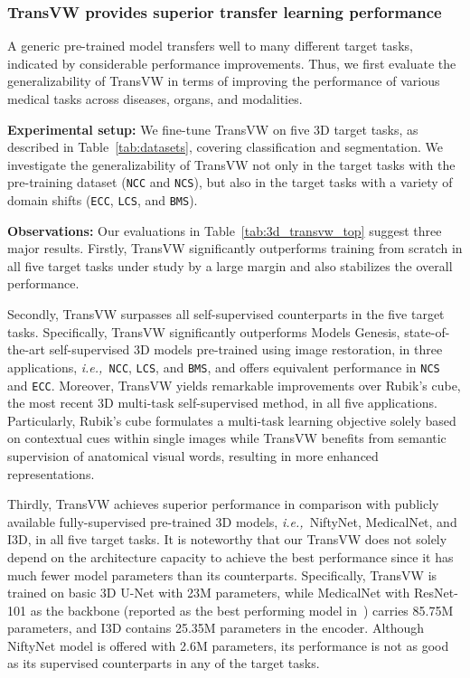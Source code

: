 \documentclass[journal,twoside,web]{ieeecolor}
\def\tablename{Table}
\newcommand{\ie}{\mbox{\emph{i.e.,\ }}}
\begin{document}
\subsubsection {TransVW provides superior transfer learning performance}
\label{sec:result_annot_effic_performance}
A generic pre-trained model transfers well to many different target tasks, indicated by considerable performance improvements. Thus, we first evaluate the generalizability of TransVW in terms of improving the performance of various medical tasks across diseases, organs, and modalities. 

\smallskip
\noindent\textbf{Experimental setup:} We fine-tune TransVW on five 3D target tasks, as described in \tablename~\ref{tab:datasets}, covering classification and segmentation. We investigate the generalizability of TransVW  not only in the target tasks with the pre-training dataset   (\texttt{NCC} and \texttt{NCS}), but also in the target tasks with a variety of domain shifts (\texttt{ECC}, \texttt{LCS}, and \texttt{BMS}).




\smallskip
\noindent\textbf{Observations:} Our evaluations in \tablename~\ref{tab:3d_transvw_top} suggest three major results. 
Firstly, TransVW significantly outperforms training from scratch in all five target tasks under study by  a large margin and also stabilizes the overall performance.

Secondly, TransVW surpasses all self-supervised counterparts in the five target tasks. Specifically, TransVW significantly outperforms Models Genesis, state-of-the-art self-supervised 3D models pre-trained using image restoration, in three applications, \ie \texttt{NCC}, \texttt{LCS}, and \texttt{BMS}, and offers equivalent performance in \texttt{NCS} and \texttt{ECC}.  Moreover, TransVW yields remarkable improvements over Rubik's cube, the most recent 3D multi-task self-supervised method, in all five applications. Particularly,  Rubik's cube formulates a multi-task learning objective solely based on contextual cues within single images while TransVW benefits from semantic supervision of anatomical visual words, resulting in more enhanced representations.

 Thirdly, TransVW achieves superior performance in comparison with publicly available fully-supervised  pre-trained 3D models, \ie NiftyNet, MedicalNet, and I3D, in all five target tasks.  It is noteworthy that our TransVW does not  solely depend on  the architecture capacity to achieve the best performance since it has much fewer  model parameters than its  counterparts. Specifically, TransVW is trained on basic 3D U-Net with  23M parameters, while MedicalNet with ResNet-101 as the backbone (reported as the best performing model in~\cite{chen2019med3d}) carries 85.75M parameters, and I3D contains 25.35M parameters in the encoder. Although NiftyNet model is offered with 2.6M parameters, its performance is not as good as its supervised counterparts  in any of the target tasks.
\end{document}
